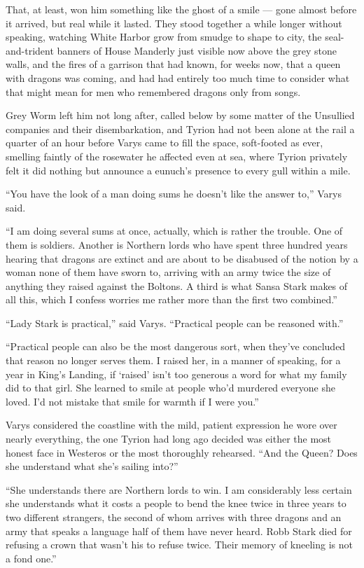 That, at least, won him something like the ghost of a smile — gone almost before it arrived, but real while it lasted. They stood together a while longer without speaking, watching White Harbor grow from smudge to shape to city, the seal-and-trident banners of House Manderly just visible now above the grey stone walls, and the fires of a garrison that had known, for weeks now, that a queen with dragons was coming, and had had entirely too much time to consider what that might mean for men who remembered dragons only from songs.

Grey Worm left him not long after, called below by some matter of the Unsullied companies and their disembarkation, and Tyrion had not been alone at the rail a quarter of an hour before Varys came to fill the space, soft-footed as ever, smelling faintly of the rosewater he affected even at sea, where Tyrion privately felt it did nothing but announce a eunuch’s presence to every gull within a mile.

“You have the look of a man doing sums he doesn’t like the answer to,” Varys said.

“I am doing several sums at once, actually, which is rather the trouble. One of them is soldiers. Another is Northern lords who have spent three hundred years hearing that dragons are extinct and are about to be disabused of the notion by a woman none of them have sworn to, arriving with an army twice the size of anything they raised against the Boltons. A third is what Sansa Stark makes of all this, which I confess worries me rather more than the first two combined.”

“Lady Stark is practical,” said Varys. “Practical people can be reasoned with.”

“Practical people can also be the most dangerous sort, when they’ve concluded that reason no longer serves them. I raised her, in a manner of speaking, for a year in King’s Landing, if ‘raised’ isn’t too generous a word for what my family did to that girl. She learned to smile at people who’d murdered everyone she loved. I’d not mistake that smile for warmth if I were you.”

Varys considered the coastline with the mild, patient expression he wore over nearly everything, the one Tyrion had long ago decided was either the most honest face in Westeros or the most thoroughly rehearsed. “And the Queen? Does she understand what she’s sailing into?”

“She understands there are Northern lords to win. I am considerably less certain she understands what it costs a people to bend the knee twice in three years to two different strangers, the second of whom arrives with three dragons and an army that speaks a language half of them have never heard. Robb Stark died for refusing a crown that wasn’t his to refuse twice. Their memory of kneeling is not a fond one.”

